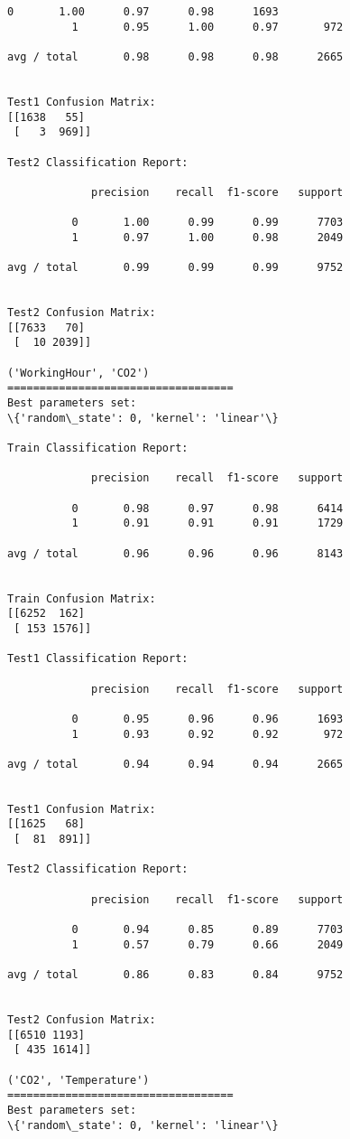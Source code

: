 \documentclass[11pt]{article}
\begin{document}
\begin{Verbatim}[commandchars=\\\{\}]
          0       1.00      0.97      0.98      1693
          1       0.95      1.00      0.97       972

avg / total       0.98      0.98      0.98      2665


Test1 Confusion Matrix:
[[1638   55]
 [   3  969]]

Test2 Classification Report:

             precision    recall  f1-score   support

          0       1.00      0.99      0.99      7703
          1       0.97      1.00      0.98      2049

avg / total       0.99      0.99      0.99      9752


Test2 Confusion Matrix:
[[7633   70]
 [  10 2039]]

('WorkingHour', 'CO2')
===================================
Best parameters set:
\{'random\_state': 0, 'kernel': 'linear'\}

Train Classification Report:

             precision    recall  f1-score   support

          0       0.98      0.97      0.98      6414
          1       0.91      0.91      0.91      1729

avg / total       0.96      0.96      0.96      8143


Train Confusion Matrix:
[[6252  162]
 [ 153 1576]]

Test1 Classification Report:

             precision    recall  f1-score   support

          0       0.95      0.96      0.96      1693
          1       0.93      0.92      0.92       972

avg / total       0.94      0.94      0.94      2665


Test1 Confusion Matrix:
[[1625   68]
 [  81  891]]

Test2 Classification Report:

             precision    recall  f1-score   support

          0       0.94      0.85      0.89      7703
          1       0.57      0.79      0.66      2049

avg / total       0.86      0.83      0.84      9752


Test2 Confusion Matrix:
[[6510 1193]
 [ 435 1614]]

('CO2', 'Temperature')
===================================
Best parameters set:
\{'random\_state': 0, 'kernel': 'linear'\}


\end{Verbatim}
\end{document}
